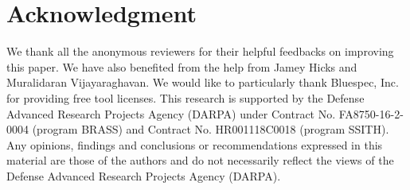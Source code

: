\documentclass[conference]{IEEEtran}
\begin{document}
\section*{Acknowledgment}
We thank all the anonymous reviewers for their helpful feedbacks on improving this paper.
We have also benefited from the help from Jamey Hicks and Muralidaran Vijayaraghavan.
We would like to particularly thank Bluespec, Inc. for providing free tool licenses.
This research is supported by the Defense Advanced Research Projects Agency (DARPA) under Contract No. FA8750-16-2-0004 (program BRASS) and Contract No. HR001118C0018 (program SSITH).
Any opinions, findings and conclusions or recommendations expressed in this material are those of the authors and do not necessarily reflect the views of the Defense Advanced Research Projects Agency (DARPA).




\end{document}
